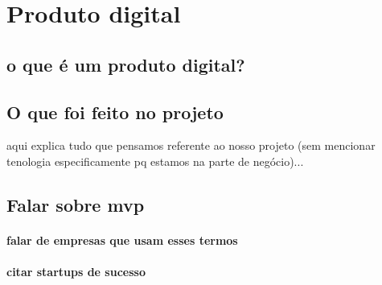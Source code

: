 \chapter{Produto digital}

\section{o que é um produto digital?}

\section{O que foi feito no projeto}

aqui explica tudo que pensamos referente ao nosso projeto (sem mencionar tenologia especificamente pq estamos na parte de negócio)...

\section{Falar sobre mvp}

\subsubsection{falar de empresas que usam esses termos}

\subsubsection{citar startups de sucesso}
